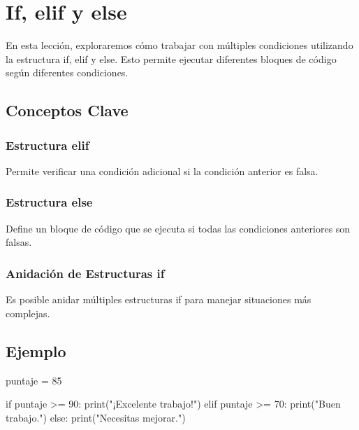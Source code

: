 \documentclass[
  a4paper,
  DIV=11,
  numbers=noendperiod,
  onepage,
  openany]{scrreprt}
\newenvironment{Shaded}{\begin{snugshade}}{\end{snugshade}}
\newcommand{\BuiltInTok}[1]{\textcolor[rgb]{0.00,0.23,0.31}{#1}}
\newcommand{\ControlFlowTok}[1]{\textcolor[rgb]{0.00,0.23,0.31}{#1}}
\newcommand{\DecValTok}[1]{\textcolor[rgb]{0.68,0.00,0.00}{#1}}
\newcommand{\NormalTok}[1]{\textcolor[rgb]{0.00,0.23,0.31}{#1}}
\newcommand{\OperatorTok}[1]{\textcolor[rgb]{0.37,0.37,0.37}{#1}}
\newcommand{\StringTok}[1]{\textcolor[rgb]{0.13,0.47,0.30}{#1}}
\begin{document}
\chapter{If, elif y else}\label{if-elif-y-else}

En esta lección, exploraremos cómo trabajar con múltiples condiciones
utilizando la estructura if, elif y else. Esto permite ejecutar
diferentes bloques de código según diferentes condiciones.

\section{Conceptos Clave}\label{conceptos-clave-14}

\subsection{Estructura elif}\label{estructura-elif-1}

Permite verificar una condición adicional si la condición anterior es
falsa.

\subsection{Estructura else}\label{estructura-else-1}

Define un bloque de código que se ejecuta si todas las condiciones
anteriores son falsas.

\subsection{Anidación de Estructuras
if}\label{anidaciuxf3n-de-estructuras-if-1}

Es posible anidar múltiples estructuras if para manejar situaciones más
complejas.

\section{Ejemplo}\label{ejemplo-9}

\begin{Shaded}
\begin{Highlighting}[]
\NormalTok{puntaje }\OperatorTok{=} \DecValTok{85}

\ControlFlowTok{if}\NormalTok{ puntaje }\OperatorTok{\textgreater{}=} \DecValTok{90}\NormalTok{:}
    \BuiltInTok{print}\NormalTok{(}\StringTok{"¡Excelente trabajo!"}\NormalTok{)}
\ControlFlowTok{elif}\NormalTok{ puntaje }\OperatorTok{\textgreater{}=} \DecValTok{70}\NormalTok{:}
    \BuiltInTok{print}\NormalTok{(}\StringTok{"Buen trabajo."}\NormalTok{)}
\ControlFlowTok{else}\NormalTok{:}
    \BuiltInTok{print}\NormalTok{(}\StringTok{"Necesitas mejorar."}\NormalTok{)}
\end{Highlighting}
\end{Shaded}
\end{document}
